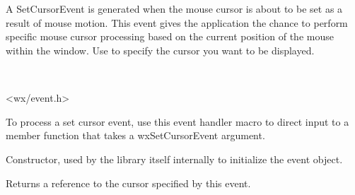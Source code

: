 \section{}\label{wxsetcursorevent}

A SetCursorEvent is generated when the mouse cursor is about to be set as a
result of mouse motion. This event gives the application the chance to perform
specific mouse cursor processing based on the current position of the mouse
within the window. Use  to
specify the cursor you want to be displayed.


\\


<wx/event.h>






To process a set cursor event, use this event handler macro to direct input to a member
function that takes a wxSetCursorEvent argument.

\twocolwidtha{7cm}
\begin{twocollist}\itemsep=0pt
\end{twocollist}%




\label{wxsetcursoreventctor}


Constructor, used by the library itself internally to initialize the event
object.


\label{wxsetcursoreventgetcursor}


Returns a reference to the cursor specified by this event.


